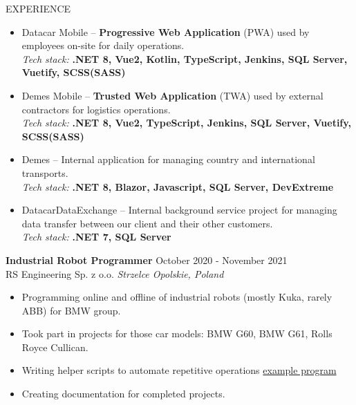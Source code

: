 \documentclass{resume}
\begin{document}
\begin{rSection}{EXPERIENCE}
\begin{itemize}[leftmargin=0.5cm]
\begin{itemize}
{        OpenID Connect + OAuth2.0 (Identity Provider 4)}
        \item Datacar Mobile – \textbf{Progressive Web Application} (PWA) used by employees on-site for daily operations. \\ [0.4em]
        \textit{Tech stack:} \textbf{.NET 8, Vue2, Kotlin, TypeScript, Jenkins, SQL Server, Vuetify, SCSS(SASS)}
        \item Demes Mobile – \textbf{Trusted Web Application} (TWA) used by external contractors for logistics operations. \\ [0.4em]
        \textit{Tech stack:} \textbf{.NET 8, Vue2, TypeScript, Jenkins, SQL Server, Vuetify, SCSS(SASS)}
        \item Demes – Internal application for managing country and international transports. \\ [0.4em]
        \textit{Tech stack:} \textbf{.NET 8, Blazor, Javascript, SQL Server, DevExtreme}
        \item DatacarDataExchange – Internal background service project for managing data transfer between our client and their other customers. \\ [0.4em]
        \textit{Tech stack:} \textbf{.NET 7, SQL Server}
    \end{itemize} 
\end{itemize}
\textbf{Industrial Robot Programmer} \hfill October 2020 - November 2021 \\ [0.4em]
RS Engineering Sp. z o.o. \hfill \textit{Strzelce Opolskie, Poland}
\begin{itemize}[leftmargin=0.5cm]
\itemsep-3pt {}
    \item Programming online and offline of industrial robots (mostly Kuka, rarely ABB) for BMW group. 
    \item Took part in projects for those car models: BMW G60, BMW G61, Rolls Royce Cullican.
    \item Writing helper scripts to automate repetitive operations \href{https://github.com/RoobyJ/KukaGo}{example program}
    \item Creating documentation for completed projects.
\end{itemize}
\end{rSection}
\end{document}
